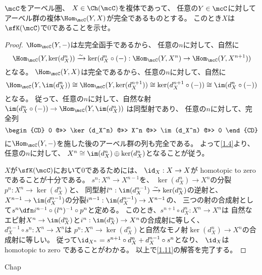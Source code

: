 \documentclass[uplatex,dvipdfmx]{jsarticle}
\begin{document}
\maketitle
\HeaderCommentA
\section{}
\fi



\begin{prob}\label{1.11}
  \(\mcC\)をアーベル圏、
  \(X\in \Ch(\mcC)\)を複体であって、
  任意の\(Y\in \mcC\)に対して
  アーベル群の複体\(\Hom_{\mcC}(Y,X)\)が完全であるものとする。
  このとき\(X\)は\(\sfK(\mcC)\)で\(0\)であることを示せ。
\end{prob}


\begin{proof}
  \(\Hom_{\mcC}(Y,-)\)は左完全函手であるから、
  任意の\(n\)に対して、自然に
  \[
  \Hom_{\mcC}(Y,\ker(d_X^n)) \xrightarrow{\sim}
  \ker(d_X^n\circ (-): \Hom_{\mcC}(Y,X^n)\to \Hom_{\mcC}(Y,X^{n+1}))
  \]
  となる。
  \(\Hom_{\mcC}(Y,X)\)は完全であるから、任意の\(n\)に対して、自然に
  \[
  \Hom_{\mcC}(Y,\im(d_X^n))
  \cong \Hom_{\mcC}(Y,\ker(d_X^{n+1}))
  \cong \ker(d_X^{n+1}\circ (-))
  \cong \im(d_X^n\circ (-))
  \]
  となる。
  従って、任意の\(n\)に対して、自然な射
  \(\im(d_X^n\circ (-))\to \Hom_{\mcC}(Y,\im(d_X^n))\)
  は同型射であり、
  任意の\(n\)に対して、完全列
  \[
  \begin{CD}
    0 @>>> \ker(d_X^n) @>>> X^n @>>> \im(d_X^n) @>>> 0
  \end{CD}
  \]
  に\(\Hom_{\mcC}(Y,-)\)を施した後のアーベル群の列も完全である。
  よって\autoref{1.4}より、任意の\(n\)に対して、
  \(X^n \cong \im(d_X^n)\oplus \ker(d_X^n)\)となることが従う。

  \(X\)が\(\sfK(\mcC)\)において\(0\)であるためには、
  \(\id_X:X\to X\)が homotopic to zero であることが十分である。
  \(s^n:X^n\to X^{n-1}\)を、
  \(\ker(d_X^n)\to X^n\)の分裂\(p^n:X^n\to \ker(d_X^n)\)と、
  同型射\(l^n:\im(d_X^{n-1})\xrightarrow{\sim}\ker(d_X^n)\)の逆射と、
  \(X^{n-1}\to \im(d_X^{n-1})\)の分裂\(i^{n-1}:\im(d_X^{n-1})\to X^{n-1}\)の、
  三つの射の合成射として\(s^n \dfn i^{n-1}\circ (l^n)^{-1}\circ p^n\)と定める。
  このとき、\(s^{n+1}\circ d_X^n:X^n\to X^n\)は
  自然なエピ射\(X^n\to \im(d_X^n)\)と\(i^n:\im(d_X^n)\to X^n\)の合成射に等しく、
  \(d_X^{n-1}\circ s^n:X^n\to X^n\)は
  \(p^n:X^n\to \ker(d_X^n)\)と自然なモノ射\(\ker(d_X^n)\to X^n\)の合成射に等しい。
  従って\(\id_{X^n} = s^{n+1}\circ d_X^n + d_X^{n-1}\circ s^n\)となり、
  \(\id_X\)は homotopic to zero であることがわかる。
  以上で\autoref{1.11}の解答を完了する。
\end{proof}




\ifcsname Chap\endcsname\else
\printbibliography
\end{document}
